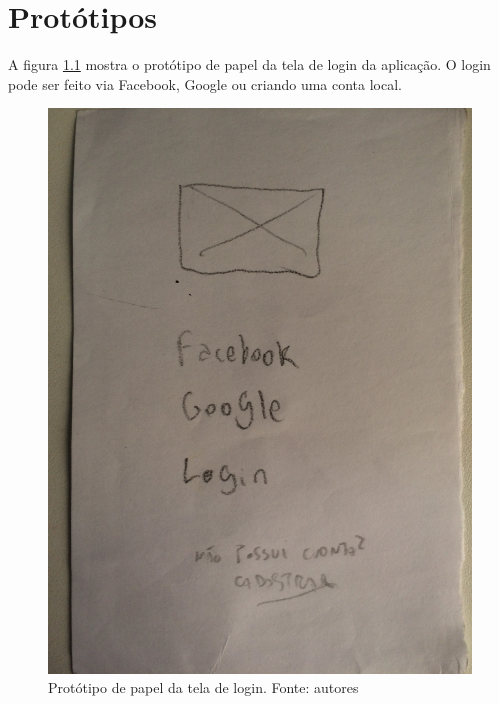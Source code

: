 \chapter{Protótipos}
\label{chap:prototipo}

A figura \ref{img:prototipo_de_papel_tela_de_login} mostra o protótipo de papel da tela de login da aplicação. O login pode ser feito via Facebook, Google ou criando uma conta local.
\begin{figure}[H]
    \centering
    \includegraphics[scale=0.1, angle=-90]{figuras/prototipo_papel_login.jpg}
    \caption[Protótipo de papel da tela de login]{Protótipo de papel da tela de login. Fonte: autores}
    \label{img:prototipo_de_papel_tela_de_login}
\end{figure}
 \pagebreak

